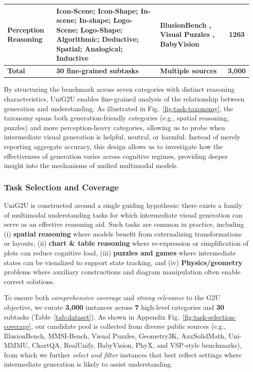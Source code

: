 \documentclass{article}
\theoremstyle{plain}
\theoremstyle{definition}
\theoremstyle{remark}
\begin{document}
\begin{table}[t]
{\begin{tabular}{@{} l p{6.5cm} p{3.5cm} c @{}}
Perception Reasoning 
& Icon-Scene; Icon-Shape; In-scene; In-shape; Logo-Scene; Logo-Shape; Algorithmic; Deductive; Spatial; Analogical; Inductive 
& IllusionBench \cite{zhang2025illusionbench}, Visual Puzzles \cite{visualpuzzles2025}, BabyVision \cite{chen2026babyvision} 
& 1263 \\ 

\midrule
\textbf{Total} & \textbf{30 fine-grained subtasks} & \textbf{Multiple sources} & \textbf{3,000} \\
\bottomrule
\end{tabular}%
}
\end{table}

By structuring the benchmark across seven categories with distinct reasoning characteristics, UniG2U enables fine-grained analysis of the relationship between generation and understanding. As illustrated in Fig.~\ref{fig:task-taxonomy}, the taxonomy spans both generation-friendly categories (e.g., spatial reasoning, puzzles) and more perception-heavy categories, allowing us to probe when intermediate visual generation is helpful, neutral, or harmful. Instead of merely reporting aggregate accuracy, this design allows us to investigate how the effectiveness of generation varies across cognitive regimes, providing deeper insight into the mechanisms of unified multimodal models.

\subsubsection{Task Selection and Coverage}
\label{sec:task-selection}


\label{sec:task-format}

UniG2U is constructed around a single guiding hypothesis: there exists a family of multimodal understanding tasks for which intermediate visual generation can serve as an effective reasoning aid. Such tasks are common in practice, including (i) \textbf{spatial reasoning} where models benefit from externalizing transformations or layouts, (ii) \textbf{chart \& table reasoning} where re-expression or simplification of plots can reduce cognitive load, (iii) \textbf{puzzles and games} where intermediate states can be visualized to support state tracking, and (iv) \textbf{Physics/geometry} problems where auxiliary constructions and diagram manipulation often enable correct solutions.

To ensure both \emph{comprehensive coverage} and \emph{strong relevance} to the G2U objective, we curate \textbf{3,000} instances across \textbf{7} high-level categories and \textbf{30} subtasks (Table~\ref{tab:dataset}). As shown in Appendix Fig.~\ref{fig:task-selection-coverage}, our candidate pool is collected from diverse public sources (e.g., IllusionBench, MMSI-Bench, Visual Puzzles, Geometry3K, AuxSolidMath, Uni-MMMU, ChartQA, RealUnify, BabyVision, PhyX, and VSP-style benchmarks), from which we further \emph{select and filter} instances that best reflect settings where intermediate generation is likely to assist understanding.
\end{document}
